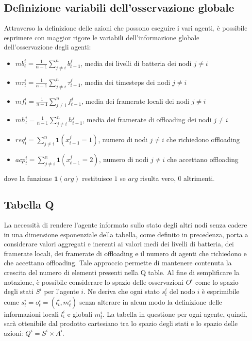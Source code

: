 \documentclass{article}
\begin{document}
\subsection{Definizione variabili dell'osservazione globale}
Attraverso la definizione delle azioni che possono eseguire i vari agenti, è possibile esprimere con maggior rigore le variabili dell'informazione globale dell'osservazione degli agenti:
\begin{itemize}
    \item $mb_t^i = \frac{1}{n-1} \sum_{j \neq i}^n b_{t-1}^j$, media dei livelli di batteria dei nodi $j \neq i$
    \item $m\tau_t^i = \frac{1}{n-1} \sum_{j \neq i}^n \tau_{t-1}^j$, media dei timesteps dei nodi $j \neq i$
    \item $mf_t^i = \frac{1}{n-1} \sum_{j \neq i}^n f_{t-1}^j$, media dei framerate locali dei nodi $j \neq i$
    \item $mh_t^i = \frac{1}{n-1} \sum_{j \neq i}^n h_{t-1}^j$, media dei framerate di offloading dei nodi $j \neq i$
    \item $req_t^i = \sum_{j \neq i}^{n} \mathbf{1}(x_{t-1}^j = 1)$, numero di nodi $j \neq i$ che richiedono offloading
    \item $acp_t^i = \sum_{j \neq i}^{n} \mathbf{1}(x_{t-1}^j = 2)$, numero di nodi $j \neq i$ che accettano offloading
\end{itemize}

dove la funzione $\mathbf{1}(arg)$ restituisce $1$ se $arg$ risulta vero, $0$ altrimenti.


\subsection{Tabella Q}
La necessità di rendere l'agente informato sullo stato degli altri nodi senza cadere in una dimensione esponenziale della tabella, come definito in precedenza, porta a considerare valori aggregati e inerenti ai valori medi dei livelli di batteria, dei framerate locali, dei framerate di offloading e il numero di agenti che richiedono e che accettano offloading. Tale approccio permette di mantenere contenuta la crescita del numero di elementi presenti nella Q table. Al fine di semplificare la notazione, è possibile considerare lo spazio delle osservazioni $O^i$ come lo spazio degli stati $S^i$ per l'agente $i$. Ne deriva che ogni stato $s_t^i$ del nodo $i$ è esprimibile come $s_t^i = o_t^i = (l_t^i, m_t^i)$ senza alterare in alcun modo la definizione delle informazioni locali $l_t^i$ e globali $m_t^i$. La tabella in questione per ogni agente, quindi, sarà ottenibile dal prodotto cartesiano tra lo spazio degli stati e lo spazio delle azioni: $Q^i =S^i \times A^i $.\\
\end{document}
